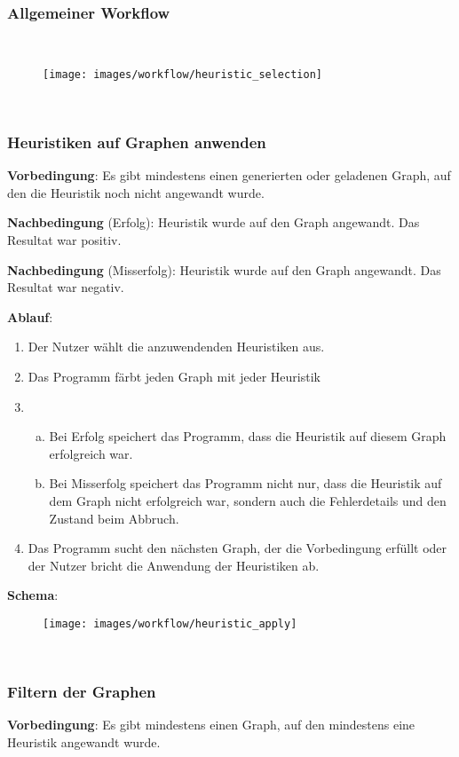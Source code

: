\documentclass{article}
\begin{document}
	\FloatBarrier
	\subsubsection{Allgemeiner Workflow}
	~\begin{figure}[!h]
		\centering
		\texttt{[image: images/workflow/heuristic\_selection]}
	\end{figure}
	
	
	\FloatBarrier
	~\newpage
	\subsubsection{Heuristiken auf Graphen anwenden}
	\textbf{Vorbedingung}: Es gibt mindestens einen generierten oder geladenen Graph, auf den die Heuristik noch nicht angewandt wurde.
	
	\textbf{Nachbedingung} (Erfolg): Heuristik wurde auf den Graph angewandt. Das Resultat war positiv.
	
	\textbf{Nachbedingung} (Misserfolg): Heuristik wurde auf den Graph angewandt. Das Resultat war negativ.
	
	\textbf{Ablauf}:
	\begin{enumerate}[1)]
		\item{Der Nutzer wählt die anzuwendenden Heuristiken aus.}
		\item{Das Programm färbt jeden Graph mit jeder Heuristik}
		\item{
			\begin{enumerate}[a)]
				\item{Bei Erfolg speichert das Programm, dass die Heuristik auf diesem Graph erfolgreich war.}
				\item{Bei Misserfolg speichert das Programm nicht nur, dass die Heuristik auf dem Graph nicht erfolgreich war, sondern auch die Fehlerdetails und den Zustand beim Abbruch.}
			\end{enumerate}
		}
		\item{Das Programm sucht den nächsten Graph, der die Vorbedingung erfüllt oder der Nutzer bricht die Anwendung der Heuristiken ab.}
	\end{enumerate}
	
	\textbf{Schema}:
	~\begin{figure}[!h]
		\centering
		\texttt{[image: images/workflow/heuristic\_apply]}
	\end{figure}
	
	
	
	
	~\newpage
	\subsubsection{Filtern der Graphen}
	\textbf{Vorbedingung}: Es gibt mindestens einen Graph, auf den mindestens eine Heuristik angewandt wurde.
	
\end{document}
